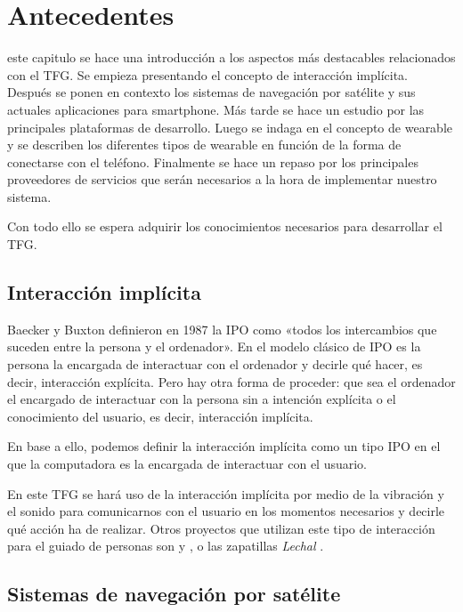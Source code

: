 \chapter{Antecedentes}
\label{chap:antecedentes}

 este capitulo se hace una introducción a los aspectos más destacables relacionados con
el \acs{TFG}. Se empieza presentando el concepto de interacción implícita. Después se ponen en
contexto los sistemas de navegación por satélite y sus actuales aplicaciones para smartphone. Más
tarde se hace un estudio por las principales plataformas de desarrollo. Luego se
indaga en el concepto de wearable y se describen los diferentes tipos de wearable en función de la
forma de conectarse con el teléfono. Finalmente se hace un repaso por los principales proveedores de
servicios que serán necesarios a la hora de implementar nuestro sistema.

Con todo ello se espera adquirir los conocimientos necesarios para desarrollar el \acs{TFG}.

\section{Interacción implícita}

Baecker y Buxton definieron en 1987 la \acf{IPO} como «todos los intercambios que suceden entre la
  persona y el ordenador». En el modelo clásico de \acs{IPO} es la persona la encargada de
interactuar con el ordenador y decirle qué hacer, es decir, interacción explícita. Pero hay otra
forma de proceder: que sea el ordenador el encargado de interactuar con la persona sin a intención
explícita o el conocimiento del usuario, es decir, interacción implícita.

En base a ello, podemos definir la interacción implícita como un tipo \acs{IPO} en el que la
computadora es la encargada de interactuar con el usuario.

En este \acs{TFG} se hará uso de la interacción implícita por medio de la vibración y el sonido para
comunicarnos con el usuario en los momentos necesarios y decirle qué acción ha de realizar. Otros
proyectos que utilizan este tipo de interacción para el guiado de personas son \cite{Boemo12} y
\cite{Merino13}, o las zapatillas \textit{Lechal} \cite{Lechal}.

\section{Sistemas de navegación por satélite}

